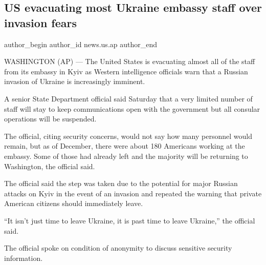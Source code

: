  
 
 
 
 
 
\subsection{US evacuating most Ukraine embassy staff over invasion fears}
\label{sec:12_02_2022.stz.news.us.ap.1.us_evacuation_ukraine}
 
\ifcmt
 author_begin
   author_id news.us.ap
 author_end
\fi

WASHINGTON (AP) — The United States is evacuating almost all of the staff from
its embassy in Kyiv as Western intelligence officials warn that a Russian
invasion of Ukraine is increasingly imminent.


A senior State Department official said Saturday that a very limited number of
staff will stay to keep communications open with the government but all
consular operations will be suspended.

The official, citing security concerns, would not say how many personnel would
remain, but as of December, there were about 180 Americans working at the
embassy. Some of those had already left and the majority will be returning to
Washington, the official said.


The official said the step was taken due to the potential for major Russian
attacks on Kyiv in the event of an invasion and repeated the warning that
private American citizens should immediately leave.

\enquote{It isn't just time to leave Ukraine, it is past time to leave
Ukraine,} the official said.

The official spoke on condition of anonymity to discuss sensitive security
information.
